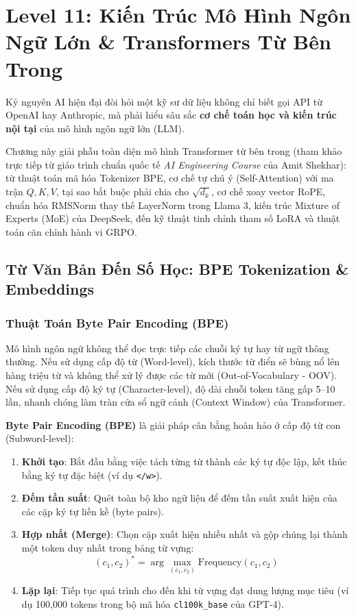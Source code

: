 \chapter{Level 11: Kiến Trúc Mô Hình Ngôn Ngữ Lớn \& Transformers Từ Bên Trong}

\begin{theorybox}
Kỷ nguyên AI hiện đại đòi hỏi một kỹ sư dữ liệu không chỉ biết gọi API từ OpenAI hay Anthropic, mà phải hiểu sâu sắc \textbf{cơ chế toán học và kiến trúc nội tại} của mô hình ngôn ngữ lớn (LLM). 

Chương này giải phẫu toàn diện mô hình Transformer từ bên trong (tham khảo trực tiếp từ giáo trình chuẩn quốc tế \textit{AI Engineering Course} của Amit Shekhar): từ thuật toán mã hóa Tokenizer BPE, cơ chế tự chú ý (Self-Attention) với ma trận $Q, K, V$, tại sao bắt buộc phải chia cho $\sqrt{d_k}$, cơ chế xoay vector RoPE, chuẩn hóa RMSNorm thay thế LayerNorm trong Llama 3, kiến trúc Mixture of Experts (MoE) của DeepSeek, đến kỹ thuật tinh chỉnh tham số LoRA và thuật toán căn chỉnh hành vi GRPO.
\end{theorybox}

\section{Từ Văn Bản Đến Số Học: BPE Tokenization \& Embeddings}

\subsection{Thuật Toán Byte Pair Encoding (BPE)}
Mô hình ngôn ngữ không thể đọc trực tiếp các chuỗi ký tự hay từ ngữ thông thường. Nếu sử dụng cấp độ từ (Word-level), kích thước từ điển sẽ bùng nổ lên hàng triệu từ và không thể xử lý được các từ mới (Out-of-Vocabulary - OOV). Nếu sử dụng cấp độ ký tự (Character-level), độ dài chuỗi token tăng gấp 5--10 lần, nhanh chóng làm tràn cửa sổ ngữ cảnh (Context Window) của Transformer.

\textbf{Byte Pair Encoding (BPE)} là giải pháp cân bằng hoàn hảo ở cấp độ từ con (Subword-level):
\begin{enumerate}
    \item \textbf{Khởi tạo}: Bắt đầu bằng việc tách từng từ thành các ký tự độc lập, kết thúc bằng ký tự đặc biệt (ví dụ \texttt{</w>}).
    \item \textbf{Đếm tần suất}: Quét toàn bộ kho ngữ liệu để đếm tần suất xuất hiện của các cặp ký tự liền kề (byte pairs).
    \item \textbf{Hợp nhất (Merge)}: Chọn cặp xuất hiện nhiều nhất và gộp chúng lại thành một token duy nhất trong bảng từ vựng:
    \begin{equation}
    (c_1, c_2)^* = \arg\max_{(c_1, c_2)} \text{Frequency}(c_1, c_2)
    \end{equation}
    \item \textbf{Lặp lại}: Tiếp tục quá trình cho đến khi từ vựng đạt dung lượng mục tiêu (ví dụ 100,000 tokens trong bộ mã hóa \texttt{cl100k\_base} của GPT-4).
\end{enumerate}

